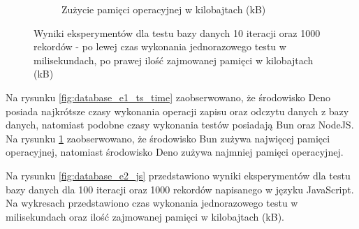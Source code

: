 \begin{figure}[H]
\begin{subfigure}[b]{0.44\textwidth}
    \caption{Zużycie pamięci operacyjnej w kilobajtach (kB)}
    \label{fig:database_e1_ts_memory}
  \end{subfigure}
  \caption{Wyniki eksperymentów dla testu bazy danych 10 iteracji oraz 1000 rekordów - po lewej czas wykonania jednorazowego testu w milisekundach, po prawej ilość zajmowanej pamięci w kilobajtach (kB)}
  \label{fig:database_e1_ts}
\end{figure}

Na rysunku \ref{fig:database_e1_ts_time} zaobserwowano, że środowisko Deno posiada najkrótsze czasy wykonania operacji zapisu oraz odczytu danych z bazy danych, natomiast podobne czasy wykonania testów posiadają Bun oraz NodeJS. Na rysunku \ref{fig:database_e1_ts_memory} zaobserwowano, że środowisko Bun zużywa najwięcej pamięci operacyjnej, natomiast środowisko Deno zużywa najmniej pamięci operacyjnej.

Na rysunku \ref{fig:database_e2_js} przedstawiono wyniki eksperymentów dla testu bazy danych dla 100 iteracji oraz 1000 rekordów napisanego w języku JavaScript. Na wykresach przedstawiono czas wykonania jednorazowego testu w milisekundach oraz ilość zajmowanej pamięci w kilobajtach (kB).

